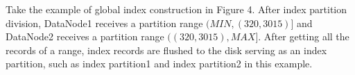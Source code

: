 \begin{example}
Take the example of global index construction in Figure 4. After index partition division, DataNode1 receives a partition range $(MIN,(320,3015)]$ and DataNode2 receives a partition range $((320,3015),MAX]$. After getting all the records of a range,  index records are flushed to the disk serving as an index partition,  such as index partition1 and index partition2 in this example.
\end{example}

